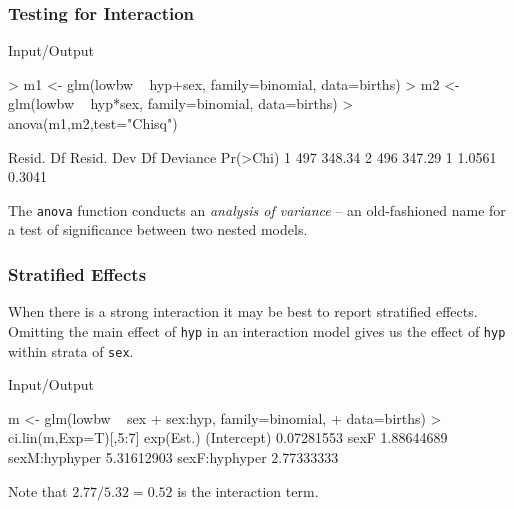 \documentclass[xcolor={table}]{beamer}
\begin{document}
\begin{frame}[fragile]\frametitle{Testing for Interaction}
\begin{exampleblock}{Input/Output}
\begin{semiverbatim}
> m1 <- glm(lowbw ~ hyp+sex, family=binomial, data=births)
> m2 <- glm(lowbw ~ hyp*sex, family=binomial, data=births)
> anova(m1,m2,test="Chisq")

  Resid. Df Resid. Dev Df Deviance Pr(>Chi)
1       497     348.34                     
2       496     347.29  1   1.0561   0.3041
\end{semiverbatim}
\end{exampleblock}
The \texttt{anova} function conducts an \emph{analysis of variance} -- an old-fashioned name for a test of significance between two nested models.
\end{frame}


\begin{frame}[fragile]\frametitle{Stratified Effects}
When there is a strong interaction it may be best to report stratified effects. Omitting the main effect of \texttt{hyp} in an interaction model gives us the effect of \texttt{hyp} within strata of \texttt{sex}.
\begin{exampleblock}{Input/Output}
\begin{semiverbatim}
m <- glm(lowbw ~ sex + sex:hyp, family=binomial, 
+                               data=births)
> ci.lin(m,Exp=T)[,5:7]
               exp(Est.)
(Intercept)   0.07281553 %
sexF          1.88644689
sexM:hyphyper 5.31612903
sexF:hyphyper 2.77333333
\end{semiverbatim}
\end{exampleblock}
Note that $2.77/5.32=0.52$ is the interaction term.
\end{frame}
\end{document}
